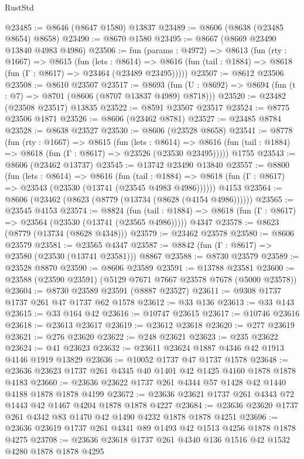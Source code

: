 \begin{lexlean}{RustStd}
\begin{coremodule}
@23485 := @8646 (@8647 @1580) @13837
@23489 := @8606 (@8638 (@23485 @8654) @8658)
@23490 := @8670 @1580
@23495 := @8667 (@8669 @23490 @13840 @4983 @4986)
@23506 := fun (params : @4972) =>
  @8613
    (fun (rty : @1667) =>
    @8615
      (fun (lets : @8614) =>
      @8616 (fun (tail : @1884) => @8618 (fun (Γ : @8617) => @23464 (@23489 @23495)))))
@23507 := @8612 @23506
@23508 := @8610 @23507
@23517 := @8693
    (fun (U : @8692) => @8694 (fun (t : @7) => @8701 (@8606 (@8707 @13837 @4989) @8718)))
@23520 := @23482 (@23508 @23517) @13835
@23522 := @8591 @23507 @23517
@23524 := @8775 @23506 @1871
@23526 := @8606 (@23462 @8781)
@23527 := @23485 @8784
@23528 := @8638 @23527
@23530 := @8606 (@23528 @8658)
@23541 := @8778
    (fun (rty : @1667) =>
    @8615
      (fun (lets : @8614) =>
      @8616 (fun (tail : @1884) => @8618 (fun (Γ : @8617) => @23526 (@23530 @23495)))))
    @1755
@23543 := @8606 (@23462 @13737)
@23545 := @13742 @23490 @13840
@23557 := @8800
    (fun (lets : @8614) =>
    @8616
      (fun (tail : @1884) =>
      @8618 (fun (Γ : @8617) => @23543 (@23530 (@13741 (@23545 @4983 @4986))))))
    @4153
@23564 := @8606 (@23462 (@8623 (@8779 (@13734 (@8628 (@4154 @4986))))))
@23565 := @23545 @4153
@23574 := @8824
    (fun (tail : @1884) => @8618 (fun (Γ : @8617) => @23564 (@23530 (@13741 (@23565 @4986)))))
    @4347
@23578 := @8623 (@8779 (@13734 (@8628 @4348)))
@23579 := @23462 @23578
@23580 := @8606 @23579
@23581 := @23565 @4347
@23587 := @8842 (fun (Γ : @8617) => @23580 (@23530 (@13741 @23581))) @8867
@23588 := @8730 @23579
@23589 := @23528 @8870
@23590 := @8606 @23589
@23591 := @13788 @23581
@23600 := @23588 (@23590 @23591) (@5129 @7671 @7667 @23578 @7678 (@5000 @23578))
@23604 := @8730 @23589 @23591 (@8887 @23527)
@23611 := @9308 @1737 @1737 @261 @47 @1737 @62 @1578
@23612 := @33 @136
@23613 := @33 @143
@23615 := @33 @164 @42
@23616 := @10747 @23615
@23617 := @10746 @23616
@23618 := @23613 @23617
@23619 := @23612 @23618
@23620 := @277 @23619
@23621 := @276 @23620
@23622 := @248 @23621
@23623 := @235 @23622
@23624 := @41 @23623
@23632 := @23611 @23624 @1887 @4346 @42 @1913 @4146 @1919 @13829
@23636 := @10052 @1737 @47 @1737 @1578
@23648 := @23636 @23623 @1737 @261 @4345 @40 @1401 @42 @1425 @4160 @1878 @1878 @4183
@23660 := @23636 @23622 @1737 @261 @4344 @57 @1428 @42 @1440 @4188 @1878 @1878 @4199
@23672 := @23636 @23621 @1737 @261 @4343 @72 @1443 @42 @1467 @4204 @1878 @1878 @4227
@23684 := @23636 @23620 @1737 @261 @4342 @83 @1470 @42 @1490 @4232 @1878 @1878 @4251
@23696 := @23636 @23619 @1737 @261 @4341 @89 @1493 @42 @1513 @4256 @1878 @1878 @4275
@23708 := @23636 @23618 @1737 @261 @4340 @136 @1516 @42 @1532 @4280 @1878 @1878 @4295

\end{coremodule}
\end{lexlean}
